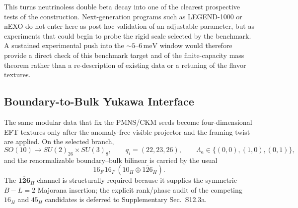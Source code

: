 \documentclass[11pt]{article}
\begin{document}
This turns neutrinoless double beta decay into one of the clearest prospective tests of the construction. Next-generation programs such as LEGEND-1000 or nEXO do not enter here as post hoc validation of an adjustable parameter, but as experiments that could begin to probe the rigid scale selected by the benchmark. A sustained experimental push into the $\sim5$--$6\,\mathrm{meV}$ window would therefore provide a direct check of this benchmark target and of the finite-capacity mass theorem rather than a re-description of existing data or a retuning of the flavor textures.

\subsection{Boundary-to-Bulk Yukawa Interface}

The same modular data that fix the PMNS/CKM seeds become four-dimensional EFT textures only after the anomaly-free visible projector and the framing twist are applied. On the selected branch,
\begin{equation}
 SO(10)\longrightarrow SU(2)_{26}\times SU(3)_8,
 \qquad
 q_i=(22,23,26),
 \qquad
 \Lambda_a\in\{(0,0),(1,0),(0,1)\},
\end{equation}
and the renormalizable boundary--bulk bilinear is carried by the usual
\begin{equation}
 16_F\,16_F\,(10_H\oplus\overline{126}_H).
\end{equation}
The $\overline{\mathbf{126}}_H$ channel is structurally required because it supplies the symmetric $B-L=2$ Majorana insertion; the explicit rank/phase audit of the competing $16_H$ and $45_H$ candidates is deferred to Supplementary Sec.~S12.3a.
\end{document}
